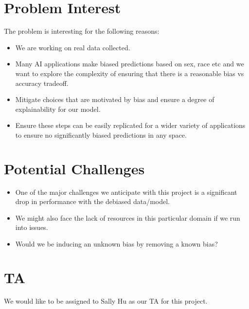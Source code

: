 \documentclass{article}
\begin{document}
\section{Problem Interest}
The problem is interesting for the following reasons:
\begin{itemize}
    \item We are working on real data collected.
    \item Many AI applications make biased predictions based on sex, race etc and we want to explore the complexity of ensuring that there is a reasonable bias vs accuracy tradeoff.
    \item Mitigate choices that are motivated by bias and ensure a degree of explainability for our model. 
    \item Ensure these steps can be easily replicated for a wider variety of applications to ensure no significantly biased predictions in any space.
\end{itemize}
\section{Potential Challenges}
\begin{itemize}
    \item One of the major challenges we anticipate with this project is a significant drop in performance with the debiased data/model. 
    \item We might also face the lack of resources in this particular domain if we run into issues.
    \item Would we be inducing an unknown bias by removing a known bias? 
\end{itemize}
\section{TA}
We would like to be assigned to Sally Hu as our TA for this project.
\end{document}
